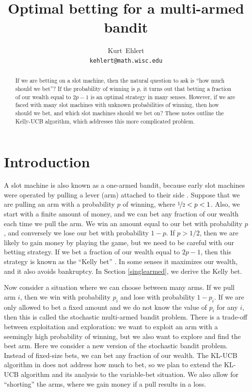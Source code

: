 \documentclass[letterpaper]{article}
\title{Optimal betting for a multi-armed bandit}
\author{
  Kurt~Ehlert\\
  \texttt{kehlert@math.wisc.edu}\\
}
\numberwithin{equation}{section}
\theoremstyle{plain}
\begin{document}

\maketitle

\begin{abstract}
If we are betting on a slot machine, then the natural question to ask is ``how much should we bet''? If the probability of winning is $p$, it turns out that betting a fraction of our wealth equal to $2p-1$ is an optimal strategy in many senses. However, if we are faced with many slot machines with unknown probabilities of winning, then how should we bet, and which slot machines should we bet on? These notes outline the Kelly-UCB algorithm, which addresses this more complicated problem.
\end{abstract}

\section{Introduction}
A slot machine is also known as a one-armed bandit, because early slot machines were operated by pulling a lever (arm) attached to their side \citep{onearmedbanditdict}. Suppose that we are pulling an arm with a probability $p$ of winning, where $\nicefrac{1}{2} < p < 1$. Also, we start with a finite amount of money, and we can bet any fraction of our wealth each time we pull the arm. We win an amount equal to our bet with probability $p$, and conversely we lose our bet with probability $1-p$. If $p > 1/2$, then we are likely to gain money by playing the game, but we need to be careful with our betting strategy. If we bet a fraction of our wealth equal to $2p-1$, then this strategy is known as the ``Kelly bet'' \citep{kelly1956new,thorp2006kelly}. In some senses it maximizes our wealth, and it also avoids bankruptcy. In Section \ref{singlearmed}, we derive the Kelly bet. 

Now consider a situation where we can choose between many arms. If we pull arm $i$, then we win with probability $p_i$ and lose with probability $1-p_i$. If we are only allowed to bet a fixed amount and we do not know the value of $p_i$ for any $i$, then this is called the stochastic multi-armed bandit problem. There is a trade-off between exploitation and exploration: we want to exploit an arm with a seemingly high probability of winning, but we also want to explore and find the best arm. Here we consider a new version of the stochastic bandit problem. Instead of fixed-size bets, we can bet any fraction of our wealth. The KL-UCB algorithm in \cite{cappe2013kullback} does not address how much to bet, so we plan to extend the KL-UCB algorithm and its analysis to the variable-bet situation. We also allow for ``shorting'' the arms, where we gain money if a pull results in a loss.
\end{document}
